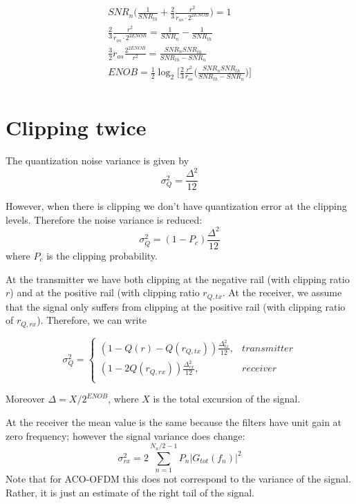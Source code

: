 \documentclass[a4paper]{article}
\begin{document}
\begin{align} \nonumber
SNR_n\bigg(\frac{1}{SNR_{th}} + \frac{2}{3}\frac{r^2}{r_{os}\cdot 2^{2ENOB}}\bigg) = 1 \\
\frac{2}{3}\frac{r^2}{r_{os}\cdot 2^{2ENOB}} = \frac{1}{SNR_n} - \frac{1}{SNR_{th}}  \\
\frac{3}{2}r_{os}\frac{2^{2ENOB}}{r^2} = \frac{SNR_nSNR_{th}}{SNR_{th} - SNR_n}  \\
ENOB= \frac{1}{2}\log_2\bigg[\frac{2}{3}\frac{r^2}{r_{os}}\bigg(\frac{SNR_nSNR_{th}}{SNR_{th} - SNR_n}\bigg)\bigg]  \\
\end{align}

\section{Clipping twice}

The quantization noise variance is given by
\begin{equation}
\sigma^2_Q = \frac{\Delta^2}{12}
\end{equation}

However, when there is clipping we don't have quantization error at the clipping levels. Therefore the noise variance is reduced:
\begin{equation}
\sigma^2_Q = (1-P_c)\frac{\Delta^2}{12}
\end{equation}
where $P_c$ is the clipping probability.

At the transmitter we have both clipping at the negative rail (with clipping ratio $r$) and at the positive rail (with clipping ratio $r_{Q,tx}$. At the receiver, we assume that the signal only suffers from clipping at the positive rail (with clipping ratio of $r_{Q,rx}$). Therefore, we can write

\begin{equation}
\sigma^2_Q = \begin{cases}
(1-Q(r)-Q(r_{Q,tx}))\frac{\Delta_{tx}^2}{12}, & transmitter \\
(1-2Q(r_{Q,rx}))\frac{\Delta_{rx}^2}{12}, & receiver \\
\end{cases}
\end{equation}

Moreover $\Delta = X/2^{ENOB}$, where $X$ is the total excursion of the signal.  

At the receiver the mean value is the same because the filters have unit gain at zero frequency; however the signal variance does change:
\begin{equation}
\sigma_{rx}^2 = 2\sum_{n = 1}^{N_u/2-1}P_n|G_{tot}(f_n)|^2
\end{equation}
Note that for ACO-OFDM this does not correspond to the variance of the signal. Rather, it is just an estimate of the right tail of the signal.
\end{document}
